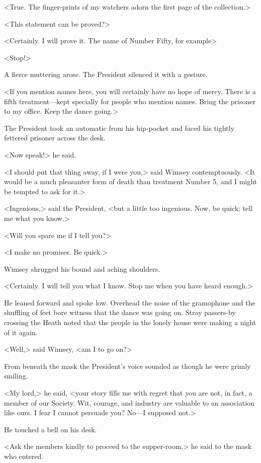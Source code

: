 <True. The finger-prints of my watchers adorn the first page of the collection.>

<This statement can be proved?>

<Certainly. I will prove it. The name of Number Fifty, for example\longdash>

<Stop!>

A fierce muttering arose. The President silenced it with a gesture.

<If you mention names here, you will certainly have no hope of mercy. There is a fifth treatment—kept specially for people who mention names. Bring the prisoner to my office. Keep the dance going.>

The President took an automatic from his hip-pocket and faced his tightly fettered prisoner across the desk.

<Now speak!> he said.

<I should put that thing away, if I were you,> said Wimsey contemptuously. <It would be a much pleasanter form of death than treatment Number 5, and I might be tempted to ask for it.>

<Ingenious,> said the President, <but a little too ingenious. Now, be quick; tell me what you know.>

<Will you spare me if I tell you?>

<I make no promises. Be quick.>

Wimsey shrugged his bound and aching shoulders.

<Certainly. I will tell you what I know. Stop me when you have heard enough.>

He leaned forward and spoke low. Overhead the noise of the gramophone and the shuffling of feet bore witness that the dance was going on. Stray passers-by crossing the Heath noted that the people in the lonely house were making a night of it again.

<Well,> said Wimsey, <am I to go on?>

From beneath the mask the President's voice sounded as though he were grimly smiling.

<My lord,> he said, <your story fills me with regret that you are not, in fact, a member of our Society. Wit, courage, and industry are valuable to an association like ours. I fear I cannot persuade you? No—I supposed not.>

He touched a bell on his desk.

<Ask the members kindly to proceed to the supper-room,> he said to the mask who entered.

